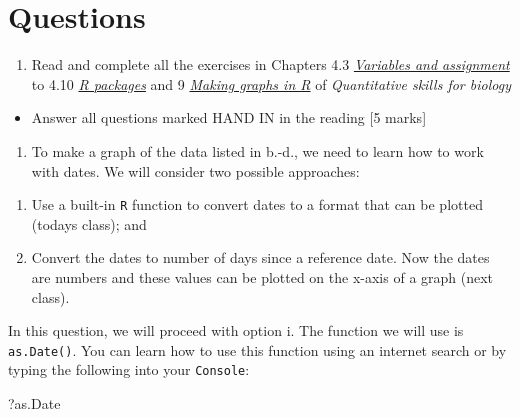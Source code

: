 \documentclass[]{book}
\newenvironment{Shaded}{\begin{snugshade}}{\end{snugshade}}
\newcommand{\NormalTok}[1]{{#1}}
\providecommand{\tightlist}{%
  \setlength{\itemsep}{0pt}\setlength{\parskip}{0pt}}
\begin{document}
\section{Questions}\label{questions}

\begin{enumerate}
\def\labelenumi{\arabic{enumi}.}
\tightlist
\item
  Read and complete all the exercises in Chapters 4.3
  \href{https://ahurford.github.io/quant-guide-all-courses/rintro.html\#variables-and-assignment}{\emph{Variables
  and assignment}} to 4.10
  \href{https://ahurford.github.io/quant-guide-all-courses/rintro.html\#r-packages}{\emph{R
  packages}} and 9
  \href{https://ahurford.github.io/quant-guide-all-courses/graph.html}{\emph{Making
  graphs in R}} of \emph{Quantitative skills for biology}
\end{enumerate}

\begin{itemize}
\tightlist
\item
  Answer all questions marked HAND IN in the reading {[}5 marks{]}
\end{itemize}

\begin{enumerate}
\def\labelenumi{\arabic{enumi}.}
\setcounter{enumi}{1}
\tightlist
\item
  To make a graph of the data listed in b.-d., we need to learn how to
  work with dates. We will consider two possible approaches:
\end{enumerate}

\begin{enumerate}
\def\labelenumi{\roman{enumi}.}
\item
  Use a built-in \texttt{R} function to convert dates to a format that
  can be plotted (todays class); and
\item
  Convert the dates to number of days since a reference date. Now the
  dates are numbers and these values can be plotted on the x-axis of a
  graph (next class).
\end{enumerate}

In this question, we will proceed with option i. The function we will
use is \texttt{as.Date()}. You can learn how to use this function using
an internet search or by typing the following into your
\texttt{Console}:

\begin{Shaded}
\begin{Highlighting}[]
\NormalTok{?as.Date}
\end{Highlighting}
\end{Shaded}
\end{document}
